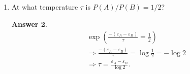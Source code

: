 \documentclass[12pt]{article}
\newenvironment{problem}[2][Problem]{\begin{trivlist}
    \item[\hskip \labelsep {\bfseries #1}\hskip \labelsep {\bfseries #2.}]}{\end{trivlist}}
\theoremstyle{definition}
\newtheorem*{answer}{Answer}
\begin{document}
\begin{problem}{4}
\begin{enumerate}[label=(\alph*)]
\begin{answer}
            For \( x \ll 1 \),
            \begin{equation}
            \label{eq:16}
            e^{-x} = 1 - x + \frac{x^2}{2} - \frac{x^{3}}{3!} + \dots
            \end{equation}

            Hence we have that
            \begin{equation}
            \label{eq:17}
            \frac{P(A)}{P(B)} = \boxed{1 - \frac{\varepsilon_{A} - \varepsilon_B}{\tau} + \mathcal{O}\left((\frac{\varepsilon_{A}-\varepsilon_B}{\tau})^2\right)}.
            \end{equation}
          \end{answer}
    \item At what temperature \(\tau\) is \( P(A)/P(B) = 1/2\)?
          \begin{answer}
            \begin{align}
            \label{eq:18}
              &\exp(\frac{-(\varepsilon_{A} - \varepsilon_B)}{\tau} = \frac{1}{2}) \\
              &\Rightarrow \frac{-(\varepsilon_{A} - \varepsilon_{B})}{\tau} = \log \frac{1}{2} = -\log 2 \\
              &\Rightarrow \boxed{\tau = \frac{\varepsilon_{A} - \varepsilon_B}{\log 2}}.
            \end{align}
          \end{answer}
  \end{enumerate}
\end{problem}
\end{document}
